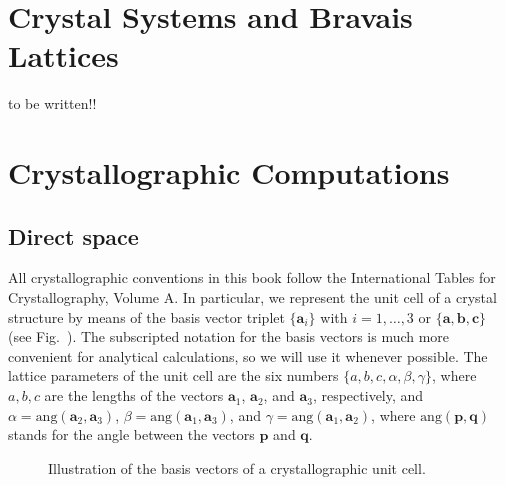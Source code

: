 \section{Crystal Systems and Bravais Lattices}

{\color{red}to be written!!}

\section{Crystallographic Computations}

\subsection{Direct space}
All crystallographic conventions in this book follow the International Tables for Crystallography, Volume A.  In particular, we represent the unit cell of a crystal structure by means of the basis vector triplet $\{\mathbf{a}_i\}$ with $i=1,\ldots,3$ or $\{\mathbf{a}, \mathbf{b},\mathbf{c}\}$ (see Fig.~). The subscripted notation for the basis vectors is much more convenient for analytical calculations, so we will use it whenever possible. The lattice parameters of the unit cell are the six numbers $\{a,b,c,\alpha,\beta,\gamma\}$, where $a, b, c$ are the lengths of the vectors $\mathbf{a}_1$, $\mathbf{a}_2$, and $\mathbf{a}_3$, respectively, and $\alpha=\text{ang}(\mathbf{a}_2,\mathbf{a}_3)$,  $\beta=\text{ang}(\mathbf{a}_1,\mathbf{a}_3)$,  and $\gamma=\text{ang}(\mathbf{a}_1,\mathbf{a}_2)$, where $\text{ang}(\mathbf{p},\mathbf{q})$ stands for the angle between the vectors $\mathbf{p}$ and $\mathbf{q}$.

\begin{wrapfigure}{r}{0.3\textwidth}
  \centering\leavevmode
\caption{\small Illustration of the basis vectors of a crystallographic unit cell.}
\end{wrapfigure}

